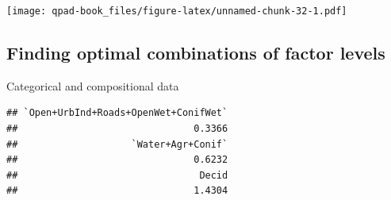\documentclass[12pt,]{book}
\newenvironment{Shaded}{\begin{snugshade}}{\end{snugshade}}
\newcommand{\CommentTok}[1]{\textcolor[rgb]{0.56,0.35,0.01}{\textit{#1}}}
\newcommand{\DataTypeTok}[1]{\textcolor[rgb]{0.13,0.29,0.53}{#1}}
\newcommand{\DecValTok}[1]{\textcolor[rgb]{0.00,0.00,0.81}{#1}}
\newcommand{\KeywordTok}[1]{\textcolor[rgb]{0.13,0.29,0.53}{\textbf{#1}}}
\newcommand{\NormalTok}[1]{#1}
\newcommand{\OperatorTok}[1]{\textcolor[rgb]{0.81,0.36,0.00}{\textbf{#1}}}
\newcommand{\StringTok}[1]{\textcolor[rgb]{0.31,0.60,0.02}{#1}}
\begin{document}
\begin{Shaded}
\end{Shaded}

\texttt{[image: qpad-book\_files/figure-latex/unnamed-chunk-32-1.pdf]}

\hypertarget{finding-optimal-combinations-of-factor-levels}{%
\subsection{Finding optimal combinations of factor levels}\label{finding-optimal-combinations-of-factor-levels}}

Categorical and compositional data

\begin{Shaded}
\end{Shaded}

\begin{verbatim}
## `Open+UrbInd+Roads+OpenWet+ConifWet` 
##                               0.3366 
##                    `Water+Agr+Conif` 
##                               0.6232 
##                                Decid 
##                               1.4304
\end{verbatim}

\begin{Shaded}
\end{Shaded}
\end{document}
